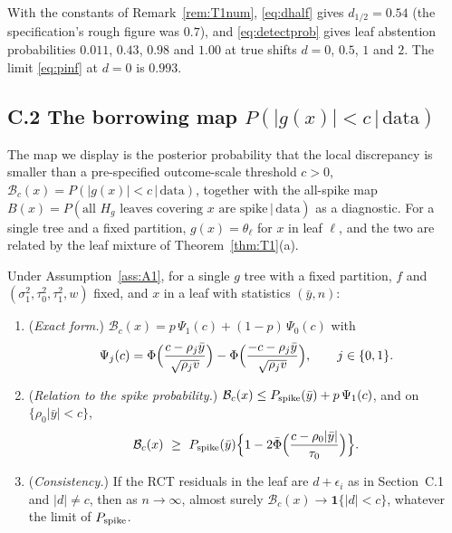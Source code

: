 \documentclass[11pt]{article}
\newcommand{\given}{\,\vert\,}
\theoremstyle{definition}
\theoremstyle{plain}
\begin{document}
{\begin{remA}\label{rem:T2num}
With the constants of Remark~\ref{rem:T1num}, \eqref{eq:dhalf} gives $d_{1/2}=0.54$ (the specification's rough figure was $0.7$), and \eqref{eq:detectprob} gives leaf abstention probabilities $0.011$, $0.43$, $0.98$ and $1.00$ at true shifts $d=0$, $0.5$, $1$ and $2$. The limit \eqref{eq:pinf} at $d=0$ is $0.993$.
\end{remA}

\subsection*{C.2 The borrowing map $P(|g(x)|<c\given\text{data})$}

The map we display is the posterior probability that the local discrepancy is smaller than a pre-specified outcome-scale threshold $c>0$, $\mathcal B_c(x)=P(|g(x)|<c\given\text{data})$, together with the all-spike map $B(x)=P(\text{all }H_g\text{ leaves covering }x\text{ are spike}\given\text{data})$ as a diagnostic. For a single tree and a fixed partition, $g(x)=\theta_\ell$ for $x$ in leaf $\ell$, and the two are related by the leaf mixture of Theorem~\ref{thm:T1}(a).

\begin{thmA}\label{thm:gmap}
Under Assumption~\ref{ass:A1}, for a single $g$ tree with a fixed partition, $f$ and $(\sigma_1^2,\tau_0^2,\tau_1^2,w)$ fixed, and $x$ in a leaf with statistics $(\bar y,n)$:
\begin{enumerate}[label=(\alph*),leftmargin=2.2em]
\item (\emph{Exact form.}) $\mathcal B_c(x)=p\,\Psi_1(c)+(1-p)\,\Psi_0(c)$ with
\[
\Psi_j(c)=\Phi\Bigl(\frac{c-\rho_j\bar y}{\sqrt{\rho_jv}}\Bigr)-\Phi\Bigl(\frac{-c-\rho_j\bar y}{\sqrt{\rho_jv}}\Bigr),\qquad j\in\{0,1\}.
\]
\item (\emph{Relation to the spike probability.}) $\mathcal B_c(x)\le P_{\mathrm{spike}}(\bar y)+p\,\Psi_1(c)$, and on $\{\rho_0|\bar y|<c\}$,
\[
\mathcal B_c(x)\ \ge\ P_{\mathrm{spike}}(\bar y)\Bigl\{1-2\bar\Phi\Bigl(\frac{c-\rho_0|\bar y|}{\tau_0}\Bigr)\Bigr\}.
\]
\item (\emph{Consistency.}) If the RCT residuals in the leaf are $d+\epsilon_i$ as in Section~C.1 and $|d|\ne c$, then as $n\to\infty$, almost surely $\mathcal B_c(x)\to\mathbf 1\{|d|<c\}$, whatever the limit of $P_{\mathrm{spike}}$.
\end{enumerate}
\end{thmA}

}
\end{document}
